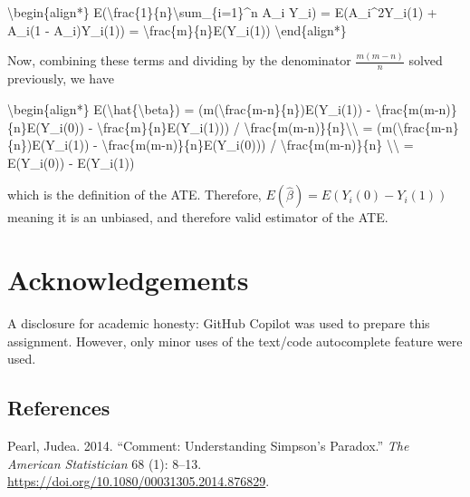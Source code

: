 \documentclass[
  11pt,
  letterpaper,
  DIV=11,
  numbers=noendperiod]{scrartcl}
\newenvironment{Shaded}{}{}
\newcommand{\NormalTok}[1]{\textcolor[rgb]{0.24,0.22,0.21}{#1}}
\newlength{\cslhangindent}
\newlength{\cslentryspacingunit} %
\newenvironment{CSLReferences}[2] %
 {%
  \setlength{\parindent}{0pt}
  \ifodd #1
  \let\oldpar\par
  \def\par{\hangindent=\cslhangindent\oldpar}
  \fi
  \setlength{\parskip}{#2\cslentryspacingunit}
 }%
 {}
\begin{document}
\begin{Shaded}
\begin{Highlighting}[]
\NormalTok{\textbackslash{}begin\{align*\}}
\NormalTok{E(\textbackslash{}frac\{1\}\{n\}\textbackslash{}sum\_\{i=1\}\^{}n A\_i Y\_i) = E(A\_i\^{}2Y\_i(1) + A\_i(1 {-} A\_i)Y\_i(1)) = \textbackslash{}frac\{m\}\{n\}E(Y\_i(1))}
\NormalTok{\textbackslash{}end\{align*\}}
\end{Highlighting}
\end{Shaded}

Now, combining these terms and dividing by the denominator
\(\frac{m(m-n)}{n}\) solved previously, we have

\begin{Shaded}
\begin{Highlighting}[]
\NormalTok{\textbackslash{}begin\{align*\}}
\NormalTok{E(\textbackslash{}hat\{\textbackslash{}beta\}) = (m(\textbackslash{}frac\{m{-}n\}\{n\})E(Y\_i(1)) {-} \textbackslash{}frac\{m(m{-}n)\}\{n\}E(Y\_i(0)) {-}  \textbackslash{}frac\{m\}\{n\}E(Y\_i(1))) / \textbackslash{}frac\{m(m{-}n)\}\{n\}\textbackslash{}\textbackslash{}}
\NormalTok{= (m(\textbackslash{}frac\{m{-}n\}\{n\})E(Y\_i(1)) {-} \textbackslash{}frac\{m(m{-}n)\}\{n\}E(Y\_i(0))) / \textbackslash{}frac\{m(m{-}n)\}\{n\} \textbackslash{}\textbackslash{}}
\NormalTok{= E(Y\_i(0)) {-} E(Y\_i(1))}
\end{Highlighting}
\end{Shaded}

which is the definition of the ATE. Therefore,
\(E(\hat{\beta}) = E(Y_i(0) - Y_i(1))\) meaning it is an unbiased, and
therefore valid estimator of the ATE.

\hypertarget{acknowledgements}{%
\section{Acknowledgements}\label{acknowledgements}}

A disclosure for academic honesty: GitHub Copilot was used to prepare
this assignment. However, only minor uses of the text/code autocomplete
feature were used.

\hypertarget{references}{%
\subsection{References}\label{references}}

\hypertarget{refs}{}
\begin{CSLReferences}{1}{0}
\leavevmode{}%
Pearl, Judea. 2014. {``Comment: Understanding Simpson's Paradox.''}
\emph{The American Statistician} 68 (1): 8--13.
\url{https://doi.org/10.1080/00031305.2014.876829}.

\end{CSLReferences}
\end{document}
